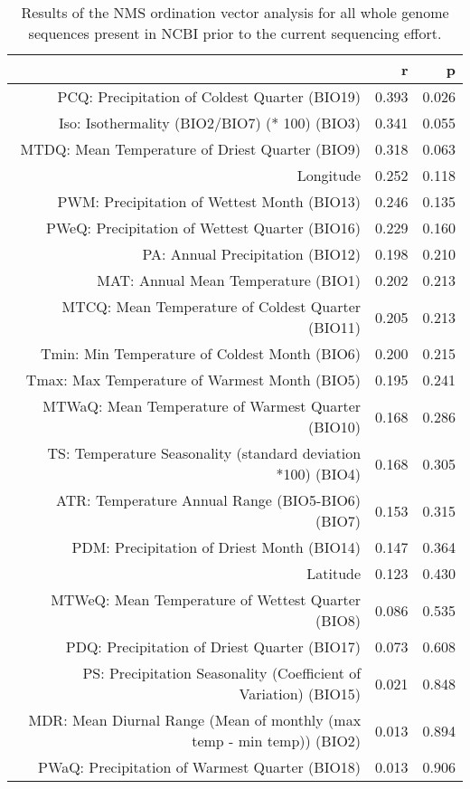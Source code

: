 \begin{table}[ht]
\centering
\begin{tabular}{rrr}
  \hline
 & r & p \\ 
  \hline
PCQ: Precipitation of Coldest Quarter (BIO19) & 0.393 & 0.026 \\ 
  Iso: Isothermality (BIO2/BIO7) (* 100) (BIO3) & 0.341 & 0.055 \\ 
  MTDQ: Mean Temperature of Driest Quarter (BIO9) & 0.318 & 0.063 \\ 
  Longitude & 0.252 & 0.118 \\ 
  PWM: Precipitation of Wettest Month (BIO13) & 0.246 & 0.135 \\ 
  PWeQ: Precipitation of Wettest Quarter (BIO16) & 0.229 & 0.160 \\ 
  PA: Annual Precipitation (BIO12) & 0.198 & 0.210 \\ 
  MAT: Annual Mean Temperature (BIO1) & 0.202 & 0.213 \\ 
  MTCQ: Mean Temperature of Coldest Quarter (BIO11) & 0.205 & 0.213 \\ 
  Tmin: Min Temperature of Coldest Month (BIO6) & 0.200 & 0.215 \\ 
  Tmax: Max Temperature of Warmest Month (BIO5) & 0.195 & 0.241 \\ 
  MTWaQ: Mean Temperature of Warmest Quarter (BIO10) & 0.168 & 0.286 \\ 
  TS: Temperature Seasonality (standard deviation *100) (BIO4) & 0.168 & 0.305 \\ 
  ATR: Temperature Annual Range (BIO5-BIO6) (BIO7) & 0.153 & 0.315 \\ 
  PDM: Precipitation of Driest Month (BIO14) & 0.147 & 0.364 \\ 
  Latitude & 0.123 & 0.430 \\ 
  MTWeQ: Mean Temperature of Wettest Quarter (BIO8) & 0.086 & 0.535 \\ 
  PDQ: Precipitation of Driest Quarter (BIO17) & 0.073 & 0.608 \\ 
  PS: Precipitation Seasonality (Coefficient of Variation) (BIO15) & 0.021 & 0.848 \\ 
  MDR: Mean Diurnal Range (Mean of monthly (max temp - min temp)) (BIO2) & 0.013 & 0.894 \\ 
  PWaQ: Precipitation of Warmest Quarter (BIO18) & 0.013 & 0.906 \\ 
   \hline
\end{tabular}
\caption{Results of the NMS ordination vector analysis for all whole genome sequences present in NCBI prior to the current sequencing effort.} 
\label{tab:wc_napg_vec}
\end{table}
